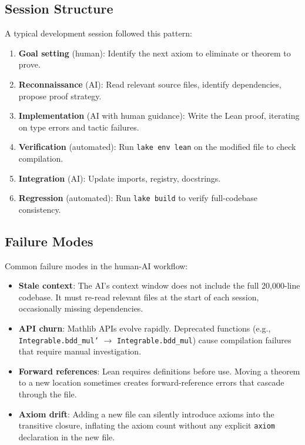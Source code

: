 \documentclass[11pt,a4paper]{article}
\theoremstyle{definition}
\newcommand{\lean}[1]{\texttt{#1}}
\begin{document}
\subsection{Session Structure}

A typical development session followed this pattern:

\begin{enumerate}
  \item \textbf{Goal setting} (human): Identify the next axiom to
    eliminate or theorem to prove.
  \item \textbf{Reconnaissance} (AI): Read relevant source files,
    identify dependencies, propose proof strategy.
  \item \textbf{Implementation} (AI with human guidance): Write the
    Lean proof, iterating on type errors and tactic failures.
  \item \textbf{Verification} (automated): Run \texttt{lake env lean}
    on the modified file to check compilation.
  \item \textbf{Integration} (AI): Update imports, registry, docstrings.
  \item \textbf{Regression} (automated): Run \texttt{lake build} to
    verify full-codebase consistency.
\end{enumerate}

\subsection{Failure Modes}

Common failure modes in the human-AI workflow:

\begin{itemize}
  \item \textbf{Stale context}: The AI's context window does not
    include the full 20,000-line codebase. It must re-read relevant
    files at the start of each session, occasionally missing
    dependencies.
  \item \textbf{API churn}: Mathlib APIs evolve rapidly.
    Deprecated functions (e.g., \lean{Integrable.bdd\_mul'} $\to$
    \lean{Integrable.bdd\_mul}) cause compilation failures that
    require manual investigation.
  \item \textbf{Forward references}: Lean requires definitions
    before use. Moving a theorem to a new location sometimes creates
    forward-reference errors that cascade through the file.
  \item \textbf{Axiom drift}: Adding a new file can silently introduce
    axioms into the transitive closure, inflating the axiom count
    without any explicit \lean{axiom} declaration in the new file.
\end{itemize}
\end{document}
